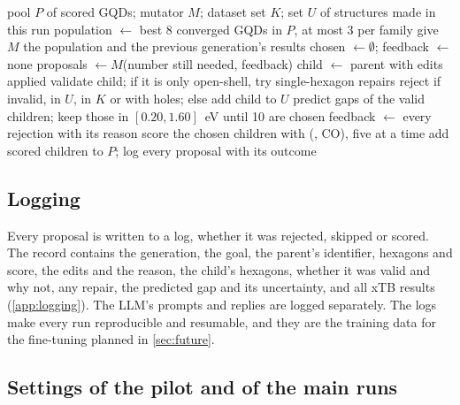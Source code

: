\begin{algorithm}[ht]
  \caption{One generation of the evolutionary loop}
  \label{alg:generation}
  \begin{algorithmic}[1]
    \Require pool \(P\) of scored GQDs; mutator \(M\); dataset set \(K\); set \(U\) of structures made in this run
    \State population \(\gets\) best 8 converged GQDs in \(P\), at most 3 per family
    \State give \(M\) the population and the previous generation's results
    \State chosen \(\gets \emptyset\); feedback \(\gets\) none
      \State proposals \(\gets M\)(number still needed, feedback)
        \State child \(\gets\) parent with edits applied 
        \State validate child; if it is only open-shell, try single-hexagon repairs
        \State reject if invalid, in \(U\), in \(K\) or with holes; else add child to \(U\)
      \EndFor
      \State predict gaps of the valid children; keep those in \([0.20, 1.60]\)~eV until 10 are chosen
      \State feedback \(\gets\) every rejection with its reason
    \EndFor
    \State score the chosen children with (, CO), five at a time
    \State add scored children to \(P\); log every proposal with its outcome
  \end{algorithmic}
\end{algorithm}

\subsection{Logging}

Every proposal is written to a log, whether it was rejected, skipped or scored. The record contains
the generation, the goal, the parent's identifier, hexagons and score, the edits and the reason,
the child's hexagons, whether it was valid and why not, any repair, the predicted gap and its
uncertainty, and all xTB results (\cref{app:logging}). The LLM's prompts and replies are logged
separately. The logs make every run reproducible and resumable, and they are the training data for
the fine-tuning planned in \cref{sec:future}.

\subsection{Settings of the pilot and of the main runs}

